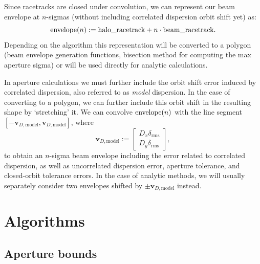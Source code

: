 Since racetracks are closed under convolution, we can represent our beam envelope at $n$-sigmas (without including correlated dispersion orbit shift yet) as:
\[
	\text{\lstinline{envelope}}(n) := \text{\lstinline{halo_racetrack}} + n \cdot \text{\lstinline{beam_racetrack}}.
\]
Depending on the algorithm this representation will be converted to a polygon (beam envelope generation functions, bisection method for computing the max aperture sigma) or will be used directly for analytic calculations.

In aperture calculations we must further include the orbit shift error induced by correlated dispersion, also referred to as \emph{model} dispersion.
In the case of converting to a polygon, we can further include this orbit shift in the resulting shape by `stretching' it.
We can convolve $\text{\lstinline{envelope}}(n)$ with the line segment $[-\mathbf{v}_{D,\mathrm{model}}, \mathbf{v}_{D,\mathrm{model}}]$, where
\[
	\mathbf{v}_{D,\mathrm{model}} := \begin{bmatrix}
	  D_x \delta_\mathrm{rms} \\
	  D_y \delta_\mathrm{rms}
	\end{bmatrix},
\]
to obtain an $n$-sigma beam envelope including the error related to correlated dispersion, as well as uncorrelated dispersion error, aperture tolerance, and closed-orbit tolerance errors.
In the case of analytic methods, we will usually separately consider two envelopes shifted by $\pm\mathbf{v}_{D,\mathrm{model}}$ instead.

\section{Algorithms}

\subsection{Aperture bounds}


